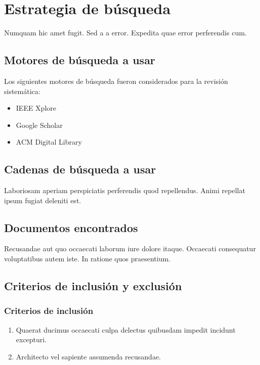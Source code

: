 \section{Estrategia de búsqueda}
Numquam hic amet fugit. Sed a a error. Expedita quae error perferendis cum.

\subsection{Motores de búsqueda a usar}
Los siguientes motores de búsqueda fueron considerados para la revisión sistemática:
\begin{itemize}
    \item IEEE Xplore
    \item Google Scholar
    \item ACM Digital Library
\end{itemize}

\subsection{Cadenas de búsqueda a usar}
Laboriosam aperiam perspiciatis perferendis quod repellendus. Animi repellat ipsum fugiat deleniti est.

\subsection{Documentos encontrados}
Recusandae aut quo occaecati laborum iure dolore itaque. Occaecati consequatur voluptatibus autem iste. In ratione quos praesentium.

\subsection{Criterios de inclusión y exclusión}
\subsubsection*{Criterios de inclusión}
\begin{enumerate}[label=CI.\arabic*.]
    \item Quaerat ducimus occaecati culpa delectus quibusdam impedit incidunt excepturi.
    \item Architecto vel sapiente assumenda recusandae.
\end{enumerate}

